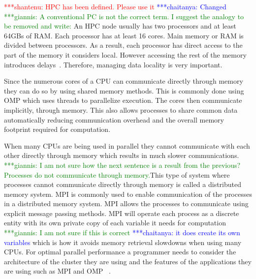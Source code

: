 \documentclass[preprint,11pt,authoryear]{elsarticle}
\newcommand{\jhanote}[1]{ {\textcolor{red} { ***shantenu: #1 }}}
\newcommand{\csnote}[1]{ {\textcolor{blue} { ***chaitanya: #1 }}}
\newcommand{\gpnote}[1]{{\textcolor{green} {***giannis: #1}}}
\newcommand{\jhanote}[1]{ {\textcolor{red} { ***shantenu: #1 }}}
\newcommand{\csnote}[1]{}
\newcommand{\gpnote}[1]{}
\begin{document}
 
\jhanote{HPC has been defined. Please use it} \csnote{Changed}
\gpnote{A conventional PC is not the correct term. I suggest the analogy to be removed and write:}
An HPC node usually has two processors and at least 64GBs of RAM. Each processor has at least 16 cores. 
Main memory or RAM is divided between processors. As a result, each processor has direct access 
to the part of the memory it considers local. However accessing the rest of the memory introduces 
delays~\citep{Jin2011}. Therefore, managing data locality is very important.

Since the numerous cores of a CPU can communicate directly through memory they can 
do so by using shared memory methods. This is commonly done using OMP 
which uses threads to parallelize execution. 
The cores then communicate implicitly, through memory. 
This also allows processes to share common data automatically reducing 
communication overhead and the overall memory footprint required 
for computation.

When many CPUs are being used in parallel they cannot communicate with each 
other directly through memory which results in much slower communications.
 \gpnote{I am not sure  how the next sentence is a result from the previous? Processes do not communicate
through memory.}This type of 
system where processes cannot communicate directly through memory is called a 
distributed memory system. MPI is commonly used to enable communication 
of the processes in a distributed memory system. MPI allows the processes 
to communicate using explicit  message passing methods. MPI will operate 
each process as a discrete entity with its own private copy of 
each variable it needs for computation 
\gpnote{I am not sure if this is correct} \csnote{it does create its own variables}
which is how it avoids memory retrieval 
slowdowns when using many CPUs. For optimal parallel performance a programmer 
needs to consider the architecture of the cluster they are using and the 
features of the applications they are using such as MPI and OMP ~\citep{Adhianto2007}.  
\end{document}
